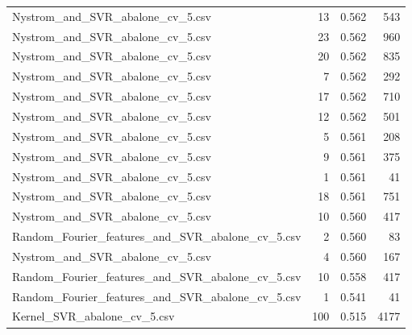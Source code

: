 \begin{tabularx}{\textwidth}{lrrr}
                Nystrom\_and\_SVR\_abalone\_cv\_5.csv &       13 &               0.562 &           543 \\
                Nystrom\_and\_SVR\_abalone\_cv\_5.csv &       23 &               0.562 &           960 \\
                Nystrom\_and\_SVR\_abalone\_cv\_5.csv &       20 &               0.562 &           835 \\
                Nystrom\_and\_SVR\_abalone\_cv\_5.csv &        7 &               0.562 &           292 \\
                Nystrom\_and\_SVR\_abalone\_cv\_5.csv &       17 &               0.562 &           710 \\
                Nystrom\_and\_SVR\_abalone\_cv\_5.csv &       12 &               0.562 &           501 \\
                Nystrom\_and\_SVR\_abalone\_cv\_5.csv &        5 &               0.561 &           208 \\
                Nystrom\_and\_SVR\_abalone\_cv\_5.csv &        9 &               0.561 &           375 \\
                Nystrom\_and\_SVR\_abalone\_cv\_5.csv &        1 &               0.561 &            41 \\
                Nystrom\_and\_SVR\_abalone\_cv\_5.csv &       18 &               0.561 &           751 \\
                Nystrom\_and\_SVR\_abalone\_cv\_5.csv &       10 &               0.560 &           417 \\
Random\_Fourier\_features\_and\_SVR\_abalone\_cv\_5.csv &        2 &               0.560 &            83 \\
                Nystrom\_and\_SVR\_abalone\_cv\_5.csv &        4 &               0.560 &           167 \\
Random\_Fourier\_features\_and\_SVR\_abalone\_cv\_5.csv &       10 &               0.558 &           417 \\
Random\_Fourier\_features\_and\_SVR\_abalone\_cv\_5.csv &        1 &               0.541 &            41 \\
                     Kernel\_SVR\_abalone\_cv\_5.csv &      100 &               0.515 &          4177 \\
\bottomrule
\end{tabularx}

